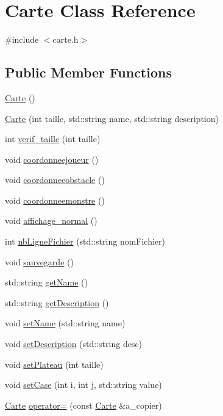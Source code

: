 \hypertarget{class_carte}{}\section{Carte Class Reference}
\label{class_carte}


{\ttfamily \#include $<$carte.\+h$>$}

\subsection*{Public Member Functions}
\begin{DoxyCompactItemize}
\item 
\hyperlink{class_carte_a06daaca86c31c80f8308f4a81d46dc9b}{Carte} ()
\item 
\hyperlink{class_carte_a23c6f00e5cc97f469b8f8de4e37f54a9}{Carte} (int taille, std\+::string name, std\+::string description)
\item 
int \hyperlink{class_carte_a49cb3378355966e82d28fd81fa84abd4}{verif\+\_\+taille} (int taille)
\item 
void \hyperlink{class_carte_ae11b9253ce5aa727b6c49320f92e0668}{coordonneejoueur} ()
\item 
void \hyperlink{class_carte_a2a0ac8476d52a07b9cbcec0507df840d}{coordonneeobstacle} ()
\item 
void \hyperlink{class_carte_ad3f5fbdd5c6a248e92bad65680493ccd}{coordonneemonstre} ()
\item 
void \hyperlink{class_carte_aa02757760851d19e549990e222d11fb5}{affichage\+\_\+normal} ()
\item 
int \hyperlink{class_carte_a2cd533b7b1a04298a19e7eef566bc7f1}{nb\+Ligne\+Fichier} (std\+::string nom\+Fichier)
\item 
void \hyperlink{class_carte_aceb1051f87ed3c407bfcf25fe4cc7778}{sauvegarde} ()
\item 
std\+::string \hyperlink{class_carte_a376e889c21215615bfa3b5068f46e646}{get\+Name} ()
\item 
std\+::string \hyperlink{class_carte_a591705d6bb95c36ce4a034b3107ae85c}{get\+Description} ()
\item 
void \hyperlink{class_carte_a1d79dbe6ded5abd1e3f1a3192af0720e}{set\+Name} (std\+::string name)
\item 
void \hyperlink{class_carte_afda8b2f0e96175d97c42afe87f535e15}{set\+Description} (std\+::string desc)
\item 
void \hyperlink{class_carte_ae9928759af0c0a63eb93039ec0d053b4}{set\+Plateau} (int taille)
\item 
void \hyperlink{class_carte_ac7dc1d4cb0accd36b36cb6c6c89103fd}{set\+Case} (int i, int j, std\+::string value)
\item 
\hyperlink{class_carte}{Carte} \hyperlink{class_carte_a29068ef0d4091cc04a1cd66b0c84bb97}{operator=} (const \hyperlink{class_carte}{Carte} \&a\+\_\+copier)
\end{DoxyCompactItemize}


